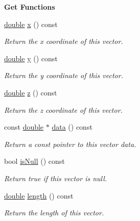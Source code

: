 \begin{Indent}{\bf Get Functions}\par
\begin{DoxyCompactItemize}
\item 
\hyperlink{_super_l_u_support_8h_a8956b2b9f49bf918deed98379d159ca7}{double} \hyperlink{class_g_l_c___vector3d_aeea63b81b5be5cf3ab5cabcfc3daac72}{x} () const 
\begin{DoxyCompactList}\small\item\em Return the x coordinate of this vector. \end{DoxyCompactList}\item 
\hyperlink{_super_l_u_support_8h_a8956b2b9f49bf918deed98379d159ca7}{double} \hyperlink{class_g_l_c___vector3d_a51238df5d97bfabca1f2095d7441ab5e}{y} () const 
\begin{DoxyCompactList}\small\item\em Return the y coordinate of this vector. \end{DoxyCompactList}\item 
\hyperlink{_super_l_u_support_8h_a8956b2b9f49bf918deed98379d159ca7}{double} \hyperlink{class_g_l_c___vector3d_a1565024742080bebc808b3d1021b2856}{z} () const 
\begin{DoxyCompactList}\small\item\em Return the z coordinate of this vector. \end{DoxyCompactList}\item 
const \hyperlink{_super_l_u_support_8h_a8956b2b9f49bf918deed98379d159ca7}{double} $\ast$ \hyperlink{class_g_l_c___vector3d_accfa06fda70def40156a6a7d7b13eeb2}{data} () const 
\begin{DoxyCompactList}\small\item\em Return a const pointer to this vector data. \end{DoxyCompactList}\item 
bool \hyperlink{class_g_l_c___vector3d_a5af792b70f28929f98bec81cbe4199f9}{is\-Null} () const 
\begin{DoxyCompactList}\small\item\em Return true if this vector is null. \end{DoxyCompactList}\item 
\hyperlink{_super_l_u_support_8h_a8956b2b9f49bf918deed98379d159ca7}{double} \hyperlink{class_g_l_c___vector3d_ac28e171f1137ee97ea3978dde80838a8}{length} () const 
\begin{DoxyCompactList}\small\item\em Return the length of this vector. \end{DoxyCompactList}\item 

\end{DoxyCompactItemize}
\end{Indent}
